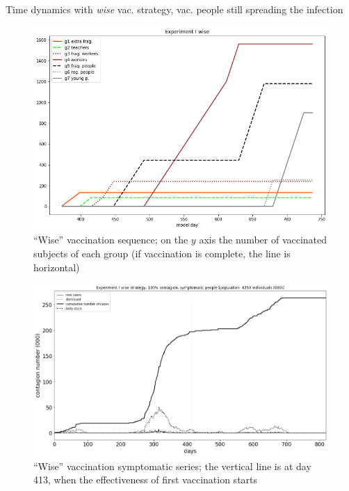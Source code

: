 \documentclass[9pt]{beamer}
\begin{document}
\begin{frame}{Time dynamics with \emph{wise} vac. strategy, vac. people still spreading the infection}

\begin{figure}[H]
\center
\includegraphics[scale=0.16]{Experiment_I_wiseVaccinationSequence.png} %

\caption{``Wise'' vaccination sequence; on the $y$ axis the number of vaccinated subjects of each group (if vaccination is complete, the line is horizontal)} 
\label{Experiment_I_wiseVaccinationSequence}
\end{figure}

\begin{figure}[H]
\center
\includegraphics[scale=0.16]{Experiment_I_1_wise_symptomatic_series.png} 

\caption{``Wise'' vaccination symptomatic series; the vertical line is at day 413, when the effectiveness of first vaccination starts} 
\label{Experiment_I_wiseSymptomaticSeries}
\end{figure}



\end{frame}
\end{document}
